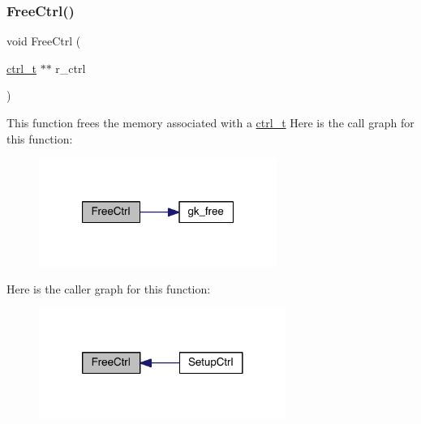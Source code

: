 \mbox{\label{a00951_ab44b3384fa925eae532b7bcc825159d7}} 
\subsubsection{\texorpdfstring{Free\+Ctrl()}{FreeCtrl()}}
{\footnotesize\ttfamily void Free\+Ctrl (\begin{DoxyParamCaption}\item[{\hyperlink{a00742}{ctrl\+\_\+t} $\ast$$\ast$}]{r\+\_\+ctrl }\end{DoxyParamCaption})}

This function frees the memory associated with a \hyperlink{a00742}{ctrl\+\_\+t} Here is the call graph for this function\+:\nopagebreak
\begin{figure}[H]
\begin{center}
\leavevmode
\includegraphics[width=220pt]{a00951_ab44b3384fa925eae532b7bcc825159d7_cgraph}
\end{center}
\end{figure}
Here is the caller graph for this function\+:\nopagebreak
\begin{figure}[H]
\begin{center}
\leavevmode
\includegraphics[width=228pt]{a00951_ab44b3384fa925eae532b7bcc825159d7_icgraph}
\end{center}
\end{figure}
\mbox{\label{a00951_a583ba60fc42c1592f69587a1ae9c94d4}} 
